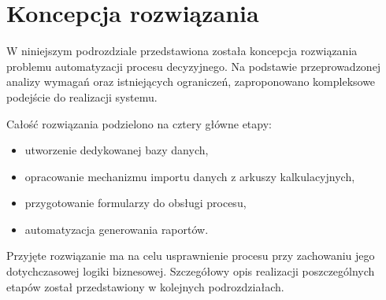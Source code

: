 \section{Koncepcja rozwiązania}

W niniejszym podrozdziale przedstawiona została koncepcja rozwiązania problemu automatyzacji procesu decyzyjnego. Na podstawie przeprowadzonej analizy wymagań oraz istniejących ograniczeń, zaproponowano kompleksowe podejście do realizacji systemu.

Całość rozwiązania podzielono na cztery główne etapy:
\begin{itemize}
    \item utworzenie dedykowanej bazy danych,
    \item opracowanie mechanizmu importu danych z arkuszy kalkulacyjnych,
    \item przygotowanie formularzy do obsługi procesu,
    \item automatyzacja generowania raportów.
\end{itemize}

Przyjęte rozwiązanie ma na celu usprawnienie procesu przy zachowaniu jego dotychczasowej logiki biznesowej. Szczegółowy opis realizacji poszczególnych etapów został przedstawiony w kolejnych podrozdziałach.